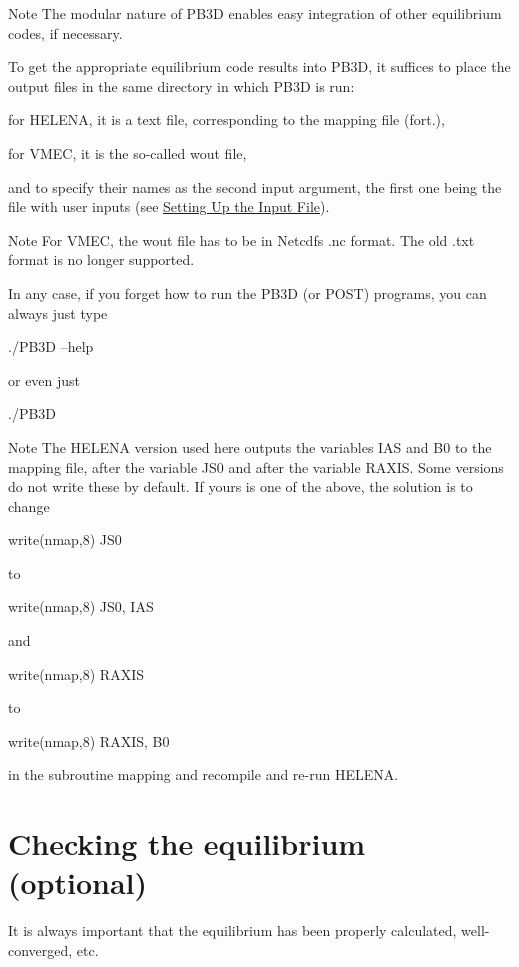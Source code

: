 \begin{DoxyNote}{Note}
The modular nature of P\+B3D enables easy integration of other equilibrium codes, if necessary.
\end{DoxyNote}
To get the appropriate equilibrium code results into P\+B3D, it suffices to place the output files in the same directory in which P\+B3D is run\+:
\begin{DoxyItemize}
\item for H\+E\+L\+E\+NA, it is a text file, corresponding to the mapping file ({\ttfamily fort.}),
\item for V\+M\+EC, it is the so-\/called {\ttfamily wout} file,
\end{DoxyItemize}

and to specify their names as the second input argument, the first one being the file with user inputs (see \hyperlink{page_tutorial_tutorial_inputs}{Setting Up the Input File}).

\begin{DoxyNote}{Note}
For V\+M\+EC, the {\ttfamily wout} file has to be in Netcdf\textquotesingle{}s {\ttfamily .nc} format. The old {\ttfamily .txt} format is no longer supported.
\end{DoxyNote}
In any case, if you forget how to run the P\+B3D (or P\+O\+ST) programs, you can always just type 
\begin{DoxyCode}
./PB3D --help 
\end{DoxyCode}
 or even just 
\begin{DoxyCode}
./PB3D 
\end{DoxyCode}


\begin{DoxyNote}{Note}
The H\+E\+L\+E\+NA version used here outputs the variables {\ttfamily I\+AS} and {\ttfamily B0} to the mapping file, after the variable {\ttfamily J\+S0} and after the variable {\ttfamily R\+A\+X\+IS}. Some versions do not write these by default. If yours is one of the above, the solution is to change 
\begin{DoxyCode}
write(nmap,8) JS0 
\end{DoxyCode}
 to 
\begin{DoxyCode}
write(nmap,8) JS0, IAS 
\end{DoxyCode}
 and 
\begin{DoxyCode}
write(nmap,8) RAXIS 
\end{DoxyCode}
 to 
\begin{DoxyCode}
write(nmap,8) RAXIS, B0 
\end{DoxyCode}
 in the subroutine {\ttfamily mapping} and recompile and re-\/run H\+E\+L\+E\+NA.
\end{DoxyNote}
\hypertarget{page_tutorial_tutorial_test_eq}{}\section{Checking the equilibrium (optional)}\label{page_tutorial_tutorial_test_eq}
It is always important that the equilibrium has been properly calculated, well-\/converged, etc.

